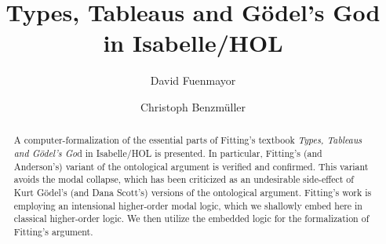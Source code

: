 \documentclass{llncs}
\begin{document}
%
\frontmatter          %
%
\pagestyle{headings}  %

%
\mainmatter              %
%
\title{Types, Tableaus and G\"odel's God \\ in Isabelle/HOL}
%
\author{David Fuenmayor \and Christoph Benzm\"uller}
%

%

\maketitle              %

\begin{abstract}
	A computer-formalization of the essential parts of Fitting's textbook
	\emph{Types, Tableaus and G\"odel's Go}d in Isabelle/HOL is
	presented. In particular, Fitting's (and Anderson's) variant of the ontological
	argument is verified and confirmed. This variant avoids the modal
	collapse, which has been criticized as an undesirable side-effect of Kurt G\"odel's (and
	Dana Scott's) versions of the ontological argument. Fitting's work
	is employing an intensional higher-order modal logic, which we
	shallowly embed here in classical higher-order logic. We then
	utilize the embedded logic for the formalization of Fitting's argument.
\end{abstract}








%




%
\end{document}
